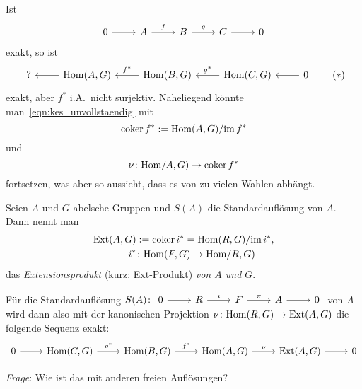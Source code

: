 Ist
\begin{equation*}
  \begin{tikzcd}
    0 \arrow{r}{}
      & A \arrow{r}{f}
      & B \arrow{r}{g}
      & C \arrow{r}{}
      & 0
  \end{tikzcd}
\end{equation*}
exakt, so ist
\begin{equation*}
  \begin{tikzcd}[arrows=leftarrow]
    ? \arrow{r}{}
      & \Hom(A,G) \arrow{r}{f^*}
      & \Hom(B,G) \arrow{r}{g^*}
      & \Hom(C,G) \arrow{r}{}
      & 0
  \end{tikzcd}
  \tag{$*$}\label{eqn:kes_unvollstaendig}
\end{equation*}
exakt, aber $f^*$ i.A.\ nicht surjektiv.
Naheliegend könnte man~\eqref{eqn:kes_unvollstaendig} mit
\begin{equation*}
  \operatorname{coker} f^* := \mathrm{Hom}(A,G) / {\operatorname{im} f^*}
\end{equation*}
und
\begin{equation*}
  \nu\colon \mathrm{Hom}/A,G) \to \operatorname{coker} f^*
\end{equation*}
fortsetzen, was aber so aussieht, dass es von zu vielen Wahlen abhängt.
\begin{defn}
  Seien $A$ und $G$ abelsche Gruppen und $S(A)$ die Standardauflösung von $A$.
  Dann nennt man
  \begin{align*}
    \mathrm{Ext}(A,G) &:= \operatorname{coker} i^* = \mathrm{Hom}(R,G) / {\operatorname{im} i^*}, \\
    i^* & \colon \mathrm{Hom}(F,G) \to \mathrm{Hom}/R,G)
  \end{align*}
  das \emph{Extensionsprodukt} (kurz: Ext-Produkt) \emph{von $A$ und $G$}.
\end{defn}
\begin{kommentar}
  Für die Standardauflösung $S(A)\colon \begin{tikzcd} 0 \arrow{r}{} &R\arrow{r}{i} &F\arrow{r}{\pi} &A\arrow{r}{}&0\end{tikzcd}$ von $A$ wird dann also mit der kanonischen Projektion $\nu\colon \mathrm{Hom}(R,G) \to \mathrm{Ext}(A,G)$ die folgende Sequenz exakt:
  \begin{equation*}
    \begin{tikzcd}
      0 \arrow{r}{}
        & \Hom(C,G) \arrow{r}{g^*}
        & \Hom(B,G) \arrow{r}{f^*}
        & \Hom(A,G) \arrow{r}{\nu}
        & \Ext(A,G) \arrow{r}{}
        & 0
    \end{tikzcd}
  \end{equation*}
\end{kommentar}
\emph{Frage}: Wie ist das mit anderen freien Auflösungen?
